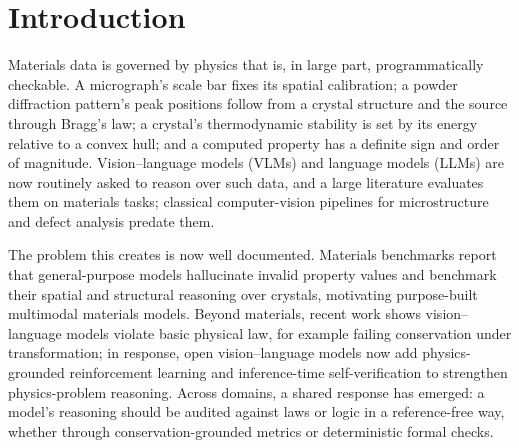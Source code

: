 \documentclass[pdflatex,sn-nature]{sn-jnl}
\begin{document}
\section*{Introduction}
Materials data is governed by physics that is, in large part, programmatically
checkable. A micrograph's scale bar fixes its spatial calibration; a powder
diffraction pattern's peak positions follow from a crystal structure and the source
through Bragg's law; a crystal's thermodynamic stability is set by its energy
relative to a convex hull; and a computed property has a definite sign and order of
magnitude. Vision--language models (VLMs) and language models (LLMs) are now
routinely asked to reason over such data, and a large literature evaluates them on
materials tasks;\cite{lai2025materials,npj2026vlmeval,choudhary2025microscopygpt,li2024mmsci}
classical computer-vision pipelines for microstructure and defect analysis predate
them.\cite{holm2020cv,li2018defect}

The problem this creates is now well documented. Materials benchmarks report that
general-purpose models hallucinate invalid property values\cite{llm4matbench2024,lai2025materials}
and benchmark their spatial and structural reasoning over crystals,\cite{atomworld2025}
motivating purpose-built multimodal materials models.\cite{matterchat2026} Beyond
materials, recent work shows vision--language models violate basic physical law,
for example failing conservation under transformation;\cite{conservationbench2026}
in response, open vision--language models now add physics-grounded reinforcement
learning and inference-time self-verification to strengthen physics-problem
reasoning.\cite{p1vl2026} Across domains, a shared response has emerged:
a model's reasoning should be audited against laws or logic in a
reference-free way, whether through conservation-grounded metrics or deterministic
formal checks.\cite{conservationbench2026,neurosymclinical2026}
\end{document}
